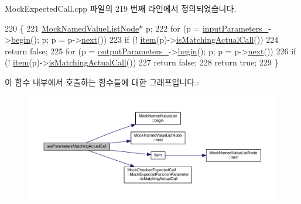 Mock\+Expected\+Call.\+cpp 파일의 219 번째 라인에서 정의되었습니다.


\begin{DoxyCode}
220 \{
221     \hyperlink{class_mock_named_value_list_node}{MockNamedValueListNode}* p;
222     \textcolor{keywordflow}{for} (p = \hyperlink{class_mock_checked_expected_call_a13ed0d812f00d134559b7436cdfb63f5}{inputParameters\_}->\hyperlink{class_mock_named_value_list_a4a5976d05542385eb64ea73eee7fc59c}{begin}(); p; p = p->\hyperlink{class_mock_named_value_list_node_adaf0ca3232d35f7efae1bade86b8027e}{next}())
223         \textcolor{keywordflow}{if} (! \hyperlink{class_mock_checked_expected_call_ae28536adf55322e7d05d9484d9b3afda}{item}(p)->\hyperlink{class_mock_checked_expected_call_1_1_mock_expected_function_parameter_a36ffbde5a157c291c77c64b690005df6}{isMatchingActualCall}())
224             \textcolor{keywordflow}{return} \textcolor{keyword}{false};
225     \textcolor{keywordflow}{for} (p = \hyperlink{class_mock_checked_expected_call_ac7fbe8f1a1ddf5d4a0f657d735e928d5}{outputParameters\_}->\hyperlink{class_mock_named_value_list_a4a5976d05542385eb64ea73eee7fc59c}{begin}(); p; p = p->\hyperlink{class_mock_named_value_list_node_adaf0ca3232d35f7efae1bade86b8027e}{next}())
226         \textcolor{keywordflow}{if} (! \hyperlink{class_mock_checked_expected_call_ae28536adf55322e7d05d9484d9b3afda}{item}(p)->\hyperlink{class_mock_checked_expected_call_1_1_mock_expected_function_parameter_a36ffbde5a157c291c77c64b690005df6}{isMatchingActualCall}())
227             \textcolor{keywordflow}{return} \textcolor{keyword}{false};
228     \textcolor{keywordflow}{return} \textcolor{keyword}{true};
229 \}
\end{DoxyCode}


이 함수 내부에서 호출하는 함수들에 대한 그래프입니다.\+:
\nopagebreak
\begin{figure}[H]
\begin{center}
\leavevmode
\includegraphics[width=350pt]{class_mock_checked_expected_call_a01fdc26233d1f10da9271532b33673ee_cgraph}
\end{center}
\end{figure}




